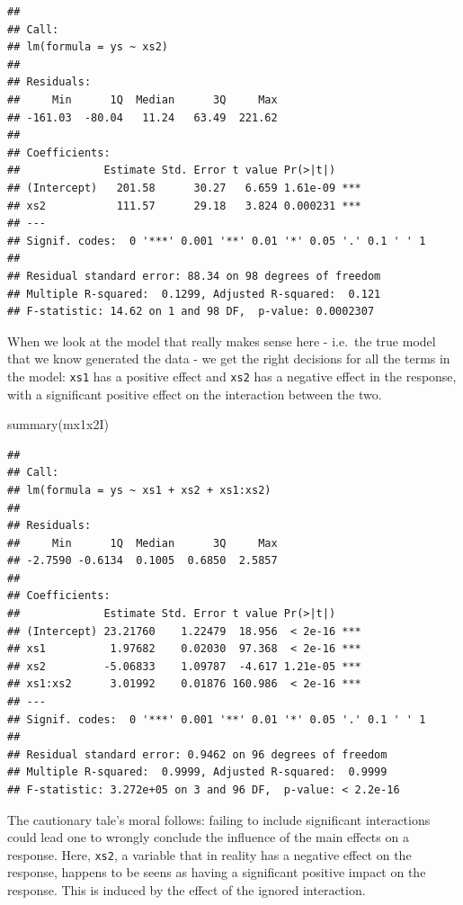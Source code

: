 \documentclass[
]{book}
\newenvironment{Shaded}{\begin{snugshade}}{\end{snugshade}}
\newcommand{\FunctionTok}[1]{\textcolor[rgb]{0.00,0.00,0.00}{#1}}
\newcommand{\NormalTok}[1]{#1}
\begin{document}
\begin{verbatim}
## 
## Call:
## lm(formula = ys ~ xs2)
## 
## Residuals:
##     Min      1Q  Median      3Q     Max 
## -161.03  -80.04   11.24   63.49  221.62 
## 
## Coefficients:
##             Estimate Std. Error t value Pr(>|t|)    
## (Intercept)   201.58      30.27   6.659 1.61e-09 ***
## xs2           111.57      29.18   3.824 0.000231 ***
## ---
## Signif. codes:  0 '***' 0.001 '**' 0.01 '*' 0.05 '.' 0.1 ' ' 1
## 
## Residual standard error: 88.34 on 98 degrees of freedom
## Multiple R-squared:  0.1299, Adjusted R-squared:  0.121 
## F-statistic: 14.62 on 1 and 98 DF,  p-value: 0.0002307
\end{verbatim}

When we look at the model that really makes sense here - i.e.~the true model that we know generated the data - we get the right decisions for all the terms in the model: \texttt{xs1} has a positive effect and \texttt{xs2} has a negative effect in the response, with a significant positive effect on the interaction between the two.

\begin{Shaded}
\begin{Highlighting}[]
\FunctionTok{summary}\NormalTok{(mx1x2I)}
\end{Highlighting}
\end{Shaded}

\begin{verbatim}
## 
## Call:
## lm(formula = ys ~ xs1 + xs2 + xs1:xs2)
## 
## Residuals:
##     Min      1Q  Median      3Q     Max 
## -2.7590 -0.6134  0.1005  0.6850  2.5857 
## 
## Coefficients:
##             Estimate Std. Error t value Pr(>|t|)    
## (Intercept) 23.21760    1.22479  18.956  < 2e-16 ***
## xs1          1.97682    0.02030  97.368  < 2e-16 ***
## xs2         -5.06833    1.09787  -4.617 1.21e-05 ***
## xs1:xs2      3.01992    0.01876 160.986  < 2e-16 ***
## ---
## Signif. codes:  0 '***' 0.001 '**' 0.01 '*' 0.05 '.' 0.1 ' ' 1
## 
## Residual standard error: 0.9462 on 96 degrees of freedom
## Multiple R-squared:  0.9999, Adjusted R-squared:  0.9999 
## F-statistic: 3.272e+05 on 3 and 96 DF,  p-value: < 2.2e-16
\end{verbatim}

The cautionary tale's moral follows: failing to include significant interactions could lead one to wrongly conclude the influence of the main effects on a response. Here, \texttt{xs2}, a variable that in reality has a negative effect on the response, happens to be seens as having a significant positive impact on the response. This is induced by the effect of the ignored interaction.
\end{document}
